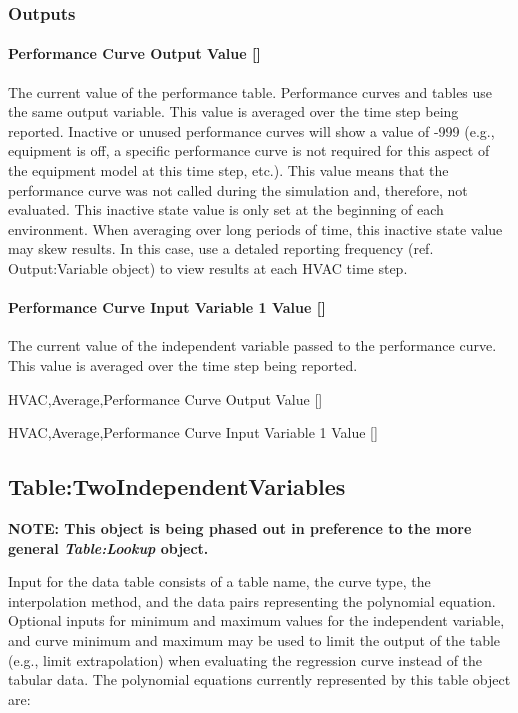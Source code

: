 \subsubsection{Outputs}\label{outputs-022}

\paragraph{Performance Curve Output Value {[]}}\label{performance-curve-output-value-000}

The current value of the performance table. Performance curves and tables use the same output variable. This value is averaged over the time step being reported. Inactive or unused performance curves will show a value of -999 (e.g., equipment is off, a specific performance curve is not required for this aspect of the equipment model at this time step, etc.). This value means that the performance curve was not called during the simulation and, therefore, not evaluated. This inactive state value is only set at the beginning of each environment. When averaging over long periods of time, this inactive state value may skew results. In this case, use a detaled reporting frequency (ref. Output:Variable object) to view results at each HVAC time step.

\paragraph{Performance Curve Input Variable 1 Value {[]}}\label{performance-curve-input-variable-1-value}

The current value of the independent variable passed to the performance curve. This value is averaged over the time step being reported.

HVAC,Average,Performance Curve Output Value {[]}

HVAC,Average,Performance Curve Input Variable 1 Value {[]}

\subsection{Table:TwoIndependentVariables}\label{tabletwoindependentvariables}

\textbf{NOTE: This object is being phased out in preference to the more general \emph{Table:Lookup} object.}

Input for the data table consists of a table name, the curve type, the interpolation method, and the data pairs representing the polynomial equation. Optional inputs for minimum and maximum values for the independent variable, and curve minimum and maximum may be used to limit the output of the table (e.g., limit extrapolation) when evaluating the regression curve instead of the tabular data. The polynomial equations currently represented by this table object are:

